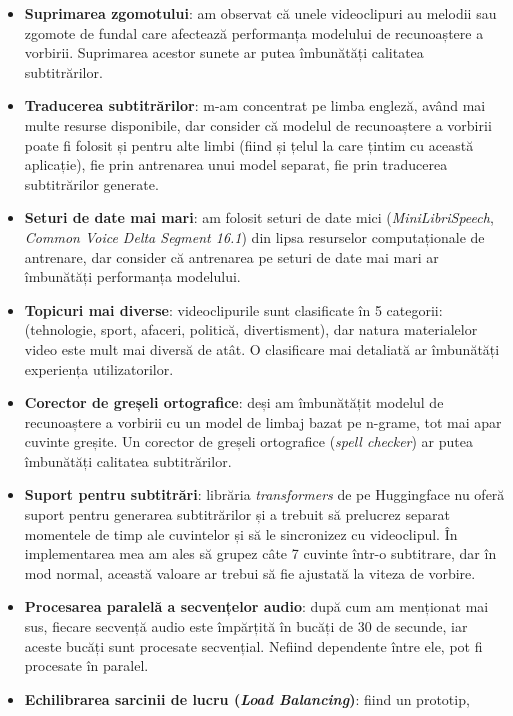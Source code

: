 \begin{itemize}
    \item \textbf{Suprimarea zgomotului}: am observat că unele videoclipuri au melodii sau 
    zgomote de fundal care afectează performanța modelului de recunoaștere a vorbirii. Suprimarea
    acestor sunete ar putea îmbunătăți calitatea subtitrărilor.
    \item \textbf{Traducerea subtitrărilor}: m-am concentrat pe limba engleză, având mai multe
    resurse disponibile, dar consider că modelul de recunoaștere a vorbirii poate fi folosit
    și pentru alte limbi (fiind și țelul la care țintim cu această aplicație), fie prin antrenarea
    unui model separat, fie prin traducerea subtitrărilor generate.
    \item \textbf{Seturi de date mai mari}: am folosit seturi de date mici (\textit{MiniLibriSpeech},
    \textit{Common Voice Delta Segment 16.1}) din lipsa resurselor computaționale de antrenare,
    dar consider că antrenarea pe seturi de date mai mari ar îmbunătăți performanța modelului.
    \item \textbf{Topicuri mai diverse}: videoclipurile sunt clasificate în 5 categorii:
    (tehnologie, sport, afaceri, politică, divertisment), dar natura materialelor video este mult
    mai diversă de atât. O clasificare mai detaliată ar îmbunătăți experiența utilizatorilor.
    \item \textbf{Corector de greșeli ortografice}: deși am îmbunătățit modelul de recunoaștere a vorbirii
    cu un model de limbaj bazat pe n-grame, tot mai apar cuvinte greșite. Un corector de greșeli ortografice
    (\textit{spell checker}) ar putea îmbunătăți calitatea subtitrărilor.
    \item \textbf{Suport pentru subtitrări}: librăria \textit{transformers} de pe Huggingface nu oferă
    suport pentru generarea subtitrărilor și a trebuit să prelucrez separat momentele de timp
    ale cuvintelor și să le sincronizez cu videoclipul. În implementarea mea am ales să grupez
    câte 7 cuvinte într-o subtitrare, dar în mod normal, această valoare ar trebui să fie ajustată
    la viteza de vorbire.
    \item \textbf{Procesarea paralelă a secvențelor audio}: după cum am menționat mai sus,
    fiecare secvență audio este împărțită în bucăți de 30 de secunde, iar aceste bucăți sunt
    procesate secvențial. Nefiind dependente între ele, pot fi procesate în paralel.
    \item \textbf{Echilibrarea sarcinii de lucru (\textit{Load Balancing})}: fiind un prototip,

\end{itemize}
